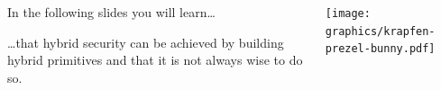 \begin{frame}[light,s]{}
  \vspace{1cm}
  \large
  \vollkorn

  \begin{columns}[c]
    \begin{column}{.30\linewidth}


      In the following slides you will learn…
      \par\vspace{1.5em}
      …that hybrid security can be achieved by building hybrid primitives and that it is not always wise to do so.
    \end{column}

    \begin{column}{.40\linewidth}
      \texttt{[image: graphics/krapfen-prezel-bunny.pdf]}
    \end{column}
  \end{columns}
\end{frame}

